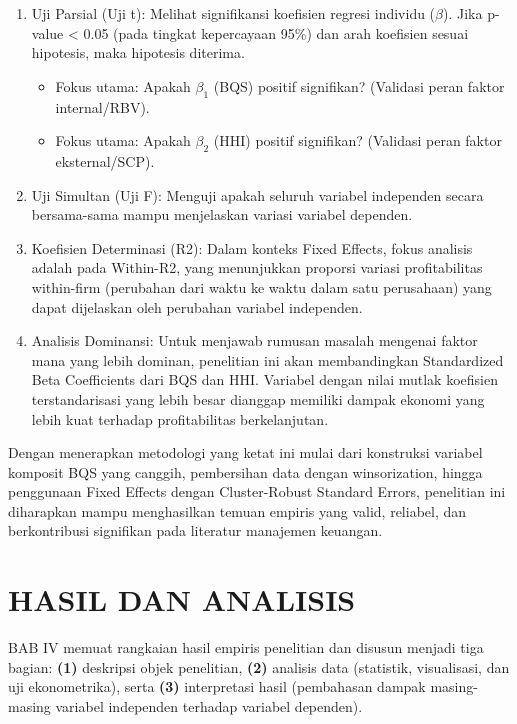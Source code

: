 \documentclass[12pt,a4paper]{report}
\providecommand{\tightlist}{%
  \setlength{\itemsep}{0pt}\setlength{\parskip}{0pt}%
}
\begin{document}
\begin{enumerate}
\def\labelenumi{\arabic{enumi}.}
\tightlist
\item
  Uji Parsial (Uji t): Melihat signifikansi koefisien regresi individu
  (\(\beta\)). Jika p-value \textless{} 0.05 (pada tingkat kepercayaan
  95\%) dan arah koefisien sesuai hipotesis, maka hipotesis diterima.

  \begin{itemize}
  \tightlist
  \item
    Fokus utama: Apakah \(\beta_1\) (BQS) positif signifikan? (Validasi
    peran faktor internal/RBV).
  \item
    Fokus utama: Apakah \(\beta_2\) (HHI) positif signifikan? (Validasi
    peran faktor eksternal/SCP).
  \end{itemize}
\item
  Uji Simultan (Uji F): Menguji apakah seluruh variabel independen
  secara bersama-sama mampu menjelaskan variasi variabel dependen.
\item
  Koefisien Determinasi (R2): Dalam konteks Fixed Effects, fokus
  analisis adalah pada Within-R2, yang menunjukkan proporsi variasi
  profitabilitas within-firm (perubahan dari waktu ke waktu dalam satu
  perusahaan) yang dapat dijelaskan oleh perubahan variabel independen.
\item
  Analisis Dominansi: Untuk menjawab rumusan masalah mengenai faktor
  mana yang lebih dominan, penelitian ini akan membandingkan
  Standardized Beta Coefficients dari BQS dan HHI. Variabel dengan nilai
  mutlak koefisien terstandarisasi yang lebih besar dianggap memiliki
  dampak ekonomi yang lebih kuat terhadap profitabilitas berkelanjutan.
\end{enumerate}

Dengan menerapkan metodologi yang ketat ini mulai dari konstruksi
variabel komposit BQS yang canggih, pembersihan data dengan
winsorization, hingga penggunaan Fixed Effects dengan Cluster-Robust
Standard Errors, penelitian ini diharapkan mampu menghasilkan temuan
empiris yang valid, reliabel, dan berkontribusi signifikan pada
literatur manajemen keuangan.

\hypertarget{hasil-dan-analisis}{%
\chapter{HASIL DAN ANALISIS}\label{hasil-dan-analisis}}

BAB IV memuat rangkaian hasil empiris penelitian dan disusun menjadi
tiga bagian: \textbf{(1)} deskripsi objek penelitian, \textbf{(2)}
analisis data (statistik, visualisasi, dan uji ekonometrika), serta
\textbf{(3)} interpretasi hasil (pembahasan dampak masing-masing
variabel independen terhadap variabel dependen).
\end{document}
